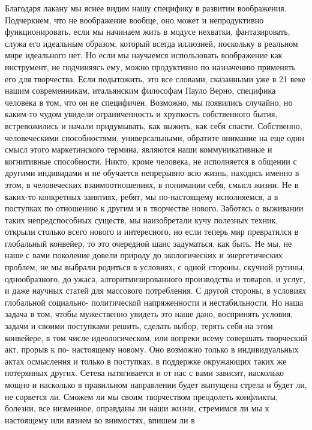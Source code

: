 Благодаря лакану мы яснее видим нашу специфику в развитии воображения.
Подчеркнем, что не воображение вообще, оно может и непродуктивно
функционировать, если мы начинаем жить в модусе нехватки, фантазировать, служа
его идеальным образом, который всегда иллюзией, поскольку в реальном мире
идеального нет. Но если мы научаемся использовать воображение как инструмент, не
подчиняясь ему, можно продуктивно по назначению применять его для творчества.
Если подытожить, это все словами, сказанными уже в 21 веке нашим современникам,
итальянским философам Пауло Верно, специфика человека в том, что он не
специфичен. Возможно, мы появились случайно, но каким-то чудом увидели
ограниченность и хрупкость собственного бытия, встревожились и начали
придумывать, как выжить, как себя спасти. Собственно, человеческими
способностями, универсальными, обратите внимание на еще один смысл этого
маркетинского термина, являются наши коммуникативные и когнитивные способности.
Никто, кроме человека, не исполняется в общении с другими индивидами и не
обучается непрерывно всю жизнь, находясь именно в этом, в человеческих
взаимоотношениях, в понимании себя, смысл жизни. Не в каких-то конкретных
занятиях, ребят, мы по-настоящему исполняемся, а в поступках по отношению к
другим и в творчестве нового. Заботясь о выживании таких непредспособных
существ, мы наизобретали кучу полезных техник, открыли столько всего нового и
интересного, но если теперь мир превратился в глобальный конвейер, то это
очередной шанс задуматься, как быть. Не мы, не наше с вами поколение довели
природу до экологических и энергетических проблем, не мы выбрали родиться в
условиях, с одной стороны, скучной рутины, однообразного, до ужаса,
алгоритмизированного производства и товаров, и услуг, и даже научных статей для
массового потребления. С другой стороны, в условиях глобальной социально-
политической напряженности и нестабильности. Но наша задача в том, чтобы
мужественно увидеть это наше дано, воспринять условия, задачи и своими
поступками решить, сделать выбор, терять себя на этом конвейере, в том числе
идеологическом, или вопреки всему совершать творческий акт, прорыв к по-
настоящему новому. Оно возможно только в индивидуальных актах осмысления и
только в поступках, в поддержке окружающих таких же потерянных других. Сетева
натягивается и от нас с вами зависит, насколько мощно и насколько в правильном
направлении будет выпущена стрела и будет ли, не сорвется ли. Сможем ли мы своим
творчеством преодолеть конфликты, болезни, все низменное, оправданы ли наши
жизни, стремимся ли мы к настоящему или вязнем во внимостях, впишем ли в
